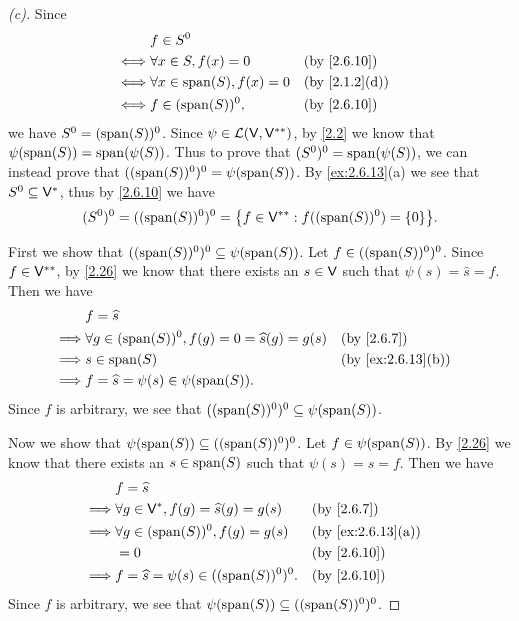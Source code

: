\begin{proof}[(c)]
  Since
  \begin{align*}
         & f \in S^0                                                        \\
    \iff & \forall x \in S, f(x) = 0       &  & \text{(by \cref{2.6.10})}   \\
    \iff & \forall x \in \spn{S}, f(x) = 0 &  & \text{(by \cref{2.1.2}(d))} \\
    \iff & f \in (\spn{S})^0,              &  & \text{(by \cref{2.6.10})}
  \end{align*}
  we have \(S^0 = (\spn{S})^0\).
  Since \(\psi \in \mathcal{L}(\mathsf{V}, \mathsf{V}^{**})\), by \cref{2.2} we know that \(\psi(\spn{S}) = \spn{\psi(S)}\).
  Thus to prove that \((S^0)^0 = \spn{\psi(S)}\), we can instead prove that \(((\spn{S})^0)^0 = \psi(\spn{S})\).
  By \cref{ex:2.6.13}(a) we see that \(S^0 \subseteq \mathsf{V}^*\), thus by \cref{2.6.10} we have
  \[
    (S^0)^0 = ((\spn{S})^0)^0 = \set{f \in \V^{**} : f((\spn{S})^0) = \set{0}}.
  \]

  First we show that \(((\spn{S})^0)^0 \subseteq \psi(\spn{S})\).
  Let \(f \in ((\spn{S})^0)^0\).
  Since \(f \in \mathsf{V}^{**}\), by \cref{2.26} we know that there exists an \(s \in \mathsf{V}\) such that \(\psi(s) = \widehat{s} = f\).
  Then we have
  \begin{align*}
             & f = \widehat{s}                                                                                  \\
    \implies & \forall g \in (\spn{S})^0, f(g) = 0 = \widehat{s}(g) = g(s) &  & \text{(by \cref{2.6.7})}        \\
    \implies & s \in \spn{S}                                               &  & \text{(by \cref{ex:2.6.13}(b))} \\
    \implies & f = \widehat{s} = \psi(s) \in \psi(\spn{S}).
  \end{align*}
  Since \(f\) is arbitrary, we see that \(((\spn{S})^0)^0 \subseteq \psi(\spn{S})\).

  Now we show that \(\psi(\spn{S}) \subseteq ((\spn{S})^0)^0\).
  Let \(f \in \psi(\spn{S})\).
  By \cref{2.26} we know that there exists an \(s \in \spn{S}\) such that \(\psi(s) = \widehat{s} = f\).
  Then we have
  \begin{align*}
             & f = \widehat{s}                                                                       \\
    \implies & \forall g \in \V^*, f(g) = \widehat{s}(g) = g(s) &  & \text{(by \cref{2.6.7})}        \\
    \implies & \forall g \in (\spn{S})^0, f(g) = g(s)           &  & \text{(by \cref{ex:2.6.13}(a))} \\
             & = 0                                              &  & \text{(by \cref{2.6.10})}       \\
    \implies & f = \widehat{s} = \psi(s) \in ((\spn{S})^0)^0.   &  & \text{(by \cref{2.6.10})}
  \end{align*}
  Since \(f\) is arbitrary, we see that \(\psi(\spn{S}) \subseteq ((\spn{S})^0)^0\).
\end{proof}

